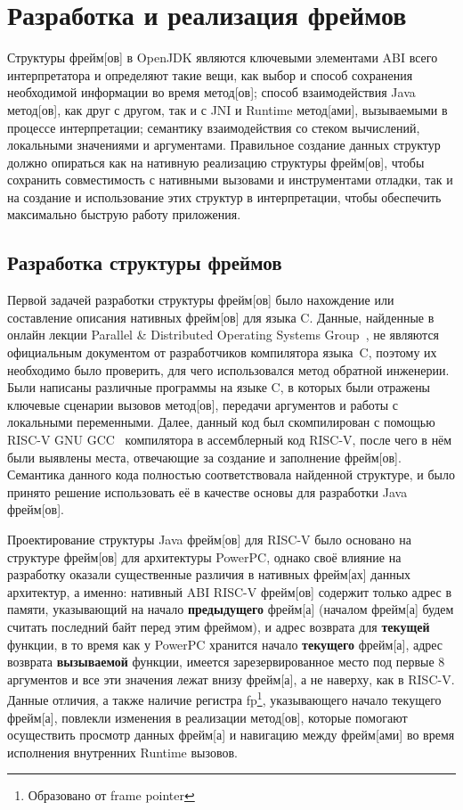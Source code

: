 \section{Разработка и реализация фреймов}

Структуры \gls{фрейм}[ов] в OpenJDK являются ключевыми элементами ABI всего интерпретатора и определяют такие вещи, как выбор и способ сохранения необходимой информации во время  \gls{метод}[ов]; способ взаимодействия Java \gls{метод}[ов], как друг с другом, так и с JNI и Runtime \gls{метод}[ами], вызываемыми в процессе интерпретации; семантику взаимодействия со стеком вычислений, локальными значениями и аргументами. Правильное создание данных структур должно опираться как на нативную реализацию структуры \gls{фрейм}[ов], чтобы сохранить совместимость с нативными вызовами и инструментами отладки, так и на создание и использование этих структур в интерпретации, чтобы обеспечить максимально быструю работу приложения.


\subsection{Разработка структуры фреймов}

Первой задачей разработки структуры \gls{фрейм}[ов] было нахождение или составление описания нативных \gls{фрейм}[ов] для языка C. Данные, найденные в онлайн лекции Parallel \& Distributed Operating Systems Group~\cite{lecture_frames}, не являются официальным документом от разработчиков компилятора языка~C, поэтому их необходимо было проверить, для чего использовался \gls{метод} обратной инженерии. Были написаны различные программы на языке C, в которых были отражены ключевые сценарии вызовов \gls{метод}[ов], передачи аргументов и работы с локальными переменными. Далее, данный код был скомпилирован с помощью RISC-V GNU GCC~\cite{riscv:gnu} компилятора в ассемблерный код RISC-V, после чего в нём были выявлены места, отвечающие за создание и заполнение \gls{фрейм}[ов]. Семантика данного кода полностью соответствовала найденной структуре, и было принято решение использовать её в качестве основы для разработки Java \gls{фрейм}[ов]. 

Проектирование структуры Java \gls{фрейм}[ов] для RISC-V было основано на структуре \gls{фрейм}[ов] для архитектуры PowerPC, однако своё влияние на разработку оказали существенные различия в нативных \gls{фрейм}[ах] данных архитектур, а именно: нативный ABI RISC-V \gls{фрейм}[ов] содержит только адрес в памяти, указывающий на начало \textbf{предыдущего} \gls{фрейм}[а] (началом \gls{фрейм}[а] будем считать последний байт перед этим фреймом), и адрес возврата для \textbf{текущей} функции, в то время как у PowerPC хранится начало \textbf{текущего} \gls{фрейм}[а], адрес возврата \textbf{вызываемой} функции, имеется зарезервированное место под первые 8 аргументов и все эти значения лежат внизу \gls{фрейм}[а], а не наверху, как в RISC-V.
Данные отличия, а также наличие регистра fp\footnote{Образовано от frame pointer}, указывающего начало текущего \gls{фрейм}[а], повлекли изменения в реализации \gls{метод}[ов], которые помогают осуществить просмотр данных \gls{фрейм}[а] и навигацию между \gls{фрейм}[ами] во время исполнения внутренних Runtime вызовов.

